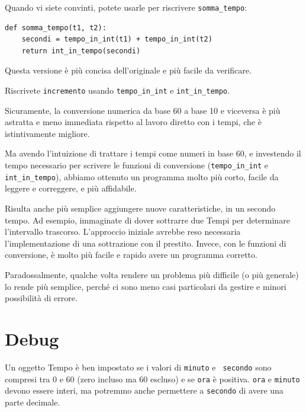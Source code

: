 \documentclass[10pt]{book}
\begin{document}
Quando vi siete convinti, potete usarle per riscrivere \verb"somma_tempo":

\begin{verbatim}
def somma_tempo(t1, t2):
    secondi = tempo_in_int(t1) + tempo_in_int(t2)
    return int_in_tempo(secondi)
\end{verbatim}
%
Questa versione è più concisa dell'originale e più facile da verificare.

\vspace{0.2in}
\begin{exercise}

Riscrivete {\tt incremento} usando \verb"tempo_in_int" e \verb"int_in_tempo".

\end{exercise}

Sicuramente, la conversione numerica da base 60 a base 10 e viceversa è più astratta e meno immediata rispetto al lavoro diretto con i tempi, che è istintivamente migliore.

Ma avendo l'intuizione di trattare i tempi come numeri in base 60, e    investendo il tempo necessario per scrivere le funzioni di conversione (\verb"tempo_in_int" e \verb"int_in_tempo"), abbiamo ottenuto un programma molto più corto, facile da leggere e correggere, e più affidabile.

Risulta anche più semplice aggiungere nuove caratteristiche, in un secondo tempo. Ad esempio, immaginate di dover sottrarre due Tempi per determinare l'intervallo trascorso. L'approccio iniziale avrebbe reso necessaria l'implementazione di  una sottrazione con il prestito. Invece, con le funzioni di conversione, è molto più facile e rapido avere un programma corretto.

Paradossalmente, qualche volta rendere un problema più difficile (o più generale) lo rende più semplice, perché ci sono meno casi particolari da gestire e minori possibilità di errore.


\section{Debug}

Un oggetto Tempo è ben impostato se i valori di {\tt minuto} e {\tt
secondo} sono compresi tra 0 e 60 (zero incluso ma 60 escluso) e se 
{\tt ora} è positiva.  {\tt ora} e {\tt minuto} devono essere interi, ma potremmo anche permettere a {\tt secondo} di avere una parte decimale.
\end{document}
